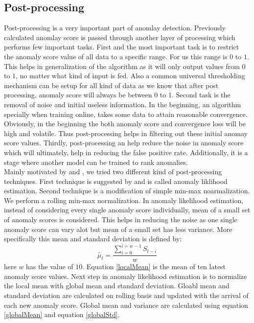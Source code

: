 \documentclass[12pt]{article}
\begin{document}
\subsection{Post-processing}
Post-processing is a very important part of anomlay detection. Previously calculated anomlay score is passed through another layer of processing which performs few important tasks. First and the most important task is to restrict the anomaly score value of all data to a specific range. For us this range is $0$ to $1$. This helps in generalization of the algorithm as it will only output values from $0$ to $1$, no matter what kind of input is fed. Also a common universal thresholding mechanism can be setup for all kind of data as we know that after post processing, anomaly score will always be between $0$ to $1$. Second task is the removal of noise and initial useless information. In the beginning, an algorithm specially when training online, takes some data to attain reasonable convergence. Obviously, in the beginning the both anomaly score and convergence loss will be high and volatile. Thus post-processing helps in filtering out these initial anomay score values. Thirdly, post-processing an help reduce the noise in anomaly score which will ultimately, help in reducing the false positive rate. Additionally, it is a stage where another model can be trained to rank anomalies.\\
\break
Mainly motivated by \cite{googleAnomalyDetection} and \cite{ahmad2017unsupervised}, we tried two different kind of post-processing techniques. First technique is suggested by \cite{ahmad2017unsupervised} and is called anomaly liklihood estimation. Second technique is a modification of simple min-max noarmalization. We perform a rolling min-max normalization.
In anomaly likelihood estimation, instead of considering every single anomaly score individually, mean of a small set of anomaly scores is considered. This helps in reducing the noise as one single anomaly score can vary alot but mean of a small set has less variance. More specifically this mean and standard deviation is defined by:
\begin{equation}
\tilde{\mu_t} = \frac{\sum_{i=0}^{i=w-1}S_{t-i}}{w}
\label{localMean}
\end{equation}
here $w$ has the value of $10$. Equation \ref{localMean} is the mean of ten latest anomaly score values.
Next step in anomaly likelihood estimation is to normalize the local mean with global mean and standard deviation. Gloabl mean and standard deviation are calculated on rolling basis and updated with the arrival of each new anomaly score. Global mean and variance are calculated using equation \ref{globalMean} and equation \ref{globalStd}. 
\end{document}
